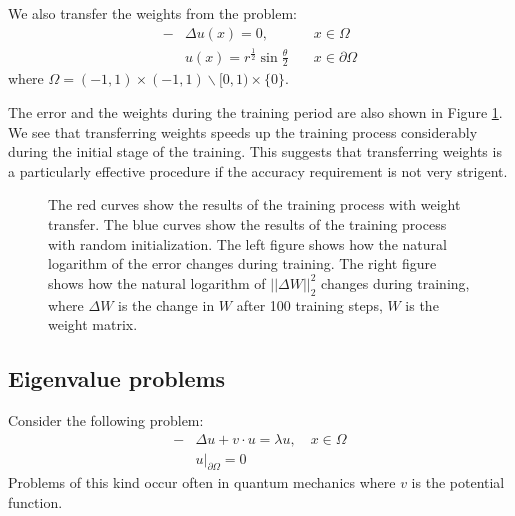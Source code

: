 \documentclass[a4paper,12pt]{article}
\begin{document}


We also transfer the weights from the problem:
\begin{equation}
\begin{aligned}
-&\Delta u(x)=0,\quad &x\in \Omega\\
&u(x)=r^{\frac{1}{2}}\sin{\frac{\theta}{2}} \quad &x\in \partial \Omega
\end{aligned}
\end{equation}
where $\Omega=(-1,1)\times (-1,1) \backslash [0,1)\times \{0\}$.


The error and the weights during the training period are also shown in Figure \ref{fig:transfer}.
We see that transferring weights speeds up the training process
considerably during the initial stage of the training.
This suggests that transferring weights is a particularly
effective procedure if the accuracy requirement is not very strigent.

\begin{figure}[!h]
\centering
{}
\caption{The red curves show the results of the training process 
with weight transfer. The blue curves show the results of
the training process with random initialization. 
The left figure shows how the natural logarithm of the
error changes during training.
The right figure shows how the natural logarithm of $||\Delta W||^2_2$ changes 
during training, where $\Delta W$ is the change in $W$ after 100 training steps,
$W$ is the weight matrix.\label{fig:transfer}}
\end{figure}


\subsection{Eigenvalue problems}

Consider the following  problem:
\begin{equation}
\begin{aligned}
-&\Delta u+v \cdot u=\lambda u, \quad x \in \Omega\\
&u|_{\partial \Omega}=0
\end{aligned}
\end{equation}
Problems of this kind occur often in quantum mechanics where
$v$ is the potential function.
\end{document}
